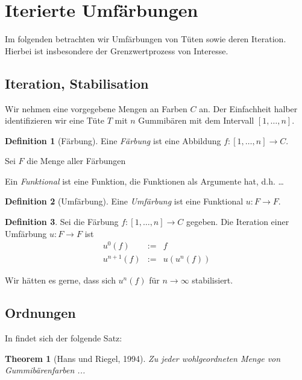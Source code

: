 \documentclass[12pt,ngerman,a4paper]{scrartcl}
\theoremstyle{plain}
\newtheorem{theorem}{Theorem}
\theoremstyle{definition}
\newtheorem{definition}{Definition}
\theoremstyle{remark}
\begin{document}
\section{Iterierte Umfärbungen }\label{sec:Iterierte-Umfärbungen}

Im folgenden betrachten wir Umfärbungen von Tüten sowie deren
Iteration.  Hierbei ist insbesondere der Grenzwertprozess von
Interesse.

\subsection{Iteration, Stabilisation}
Wir nehmen eine vorgegebene Mengen an Farben $C$ an.  Der Einfachheit
halber identifizieren wir eine Tüte $T$ mit $n$ Gummibären mit dem
Intervall $[1, \ldots, n]$.

\begin{definition}[Färbung]
Eine \emph{Färbung} ist eine Abbildung $f: [1, \ldots, n] \to C$.

Sei $F$  die Menge aller Färbungen
\end{definition}

Ein \emph{Funktional} ist eine Funktion, die Funktionen als Argumente
hat, d.h. …

\begin{definition}[Umfärbung]
Eine \emph{Umfärbung} ist eine Funktional $u: F \to F$.
\end{definition}

\begin{definition}
    Sei die Färbung $f: [1, \ldots, n] \to C$ gegeben.
    Die Iteration einer Umfärbung $u: F \to F$ ist
    \begin{equation}
        \begin{array}{rcl}
            u^0(f) &:=& f \\
            u^{n+1}(f) &:=&     u(u^{n}(f))
        \end{array}
    \end{equation}
\end{definition}

Wir hätten es gerne, dass sich $u^{n}(f)$ für $n \to \infty$
stabilisiert.

\subsection{Ordnungen}
In \citep{hans-riegel-1994} findet sich der folgende Satz:

\begin{theorem}[Hans und Riegel, 1994]
  Zu jeder wohlgeordneten Menge von Gummibärenfarben ...
\end{theorem}
\end{document}
